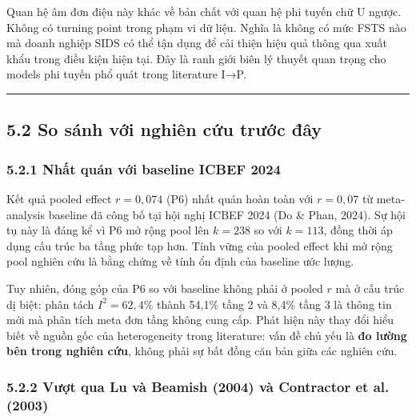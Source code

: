 \documentclass[12pt,a4paper]{article}
\begin{document}
Quan hệ âm đơn điệu này khác về bản chất với quan hệ phi tuyến chữ U
ngược. Không có turning point trong phạm vi dữ liệu. Nghĩa là không có
mức FSTS nào mà doanh nghiệp SIDS có thể tận dụng để cải thiện hiệu quả
thông qua xuất khẩu trong điều kiện hiện tại. Đây là ranh giới biên lý
thuyết quan trọng cho models phi tuyến phổ quát trong literature I→P.

\begin{center}\rule{0.5\linewidth}{0.5pt}\end{center}

\hypertarget{52-so-suxe1nh-vux1edbi-nghiuxean-cux1ee9u-trux1b0ux1edbc-ux111uxe2y}{%
\subsection{5.2 So sánh với nghiên cứu trước
đây}\label{52-so-suxe1nh-vux1edbi-nghiuxean-cux1ee9u-trux1b0ux1edbc-ux111uxe2y}}

\hypertarget{521-nhux1ea5t-quuxe1n-vux1edbi-baseline-icbef-2024}{%
\subsubsection{5.2.1 Nhất quán với baseline ICBEF
2024}\label{521-nhux1ea5t-quuxe1n-vux1edbi-baseline-icbef-2024}}

Kết quả pooled effect \(r = 0{,}074\) (P6) nhất quán hoàn toàn với
\(r = 0{,}07\) từ meta-analysis baseline đã công bố tại hội nghị ICBEF
2024 (Do \& Phan, 2024). Sự hội tụ này là đáng kể vì P6 mở rộng pool lên
\(k = 238\) so với \(k = 113\), đồng thời áp dụng cấu trúc ba tầng phức
tạp hơn. Tính vững của pooled effect khi mở rộng pool nghiên cứu là bằng
chứng về tính ổn định của baseline ước lượng.

Tuy nhiên, đóng góp của P6 so với baseline không phải ở pooled \(r\) mà
ở cấu trúc dị biệt: phân tách \(I^2 = 62{,}4\%\) thành 54,1\% tầng 2 và
8,4\% tầng 3 là thông tin mới mà phân tích meta đơn tầng không cung cấp.
Phát hiện này thay đổi hiểu biết về nguồn gốc của heterogeneity trong
literature: vấn đề chủ yếu là \textbf{đo lường bên trong nghiên cứu},
không phải sự bất đồng căn bản giữa các nghiên cứu.

\hypertarget{522-vux1b0ux1ee3t-qua-lu-vuxe0-beamish-2004-vuxe0-contractor-et-al-2003}{%
\subsubsection{5.2.2 Vượt qua Lu và Beamish (2004) và Contractor et al.
(2003)}\label{522-vux1b0ux1ee3t-qua-lu-vuxe0-beamish-2004-vuxe0-contractor-et-al-2003}}
\end{document}
